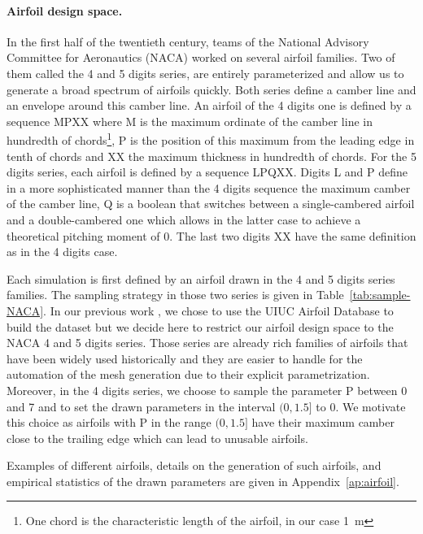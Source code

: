 \paragraph{Airfoil design space.} In the first half of the twentieth century, teams of the National Advisory Committee for Aeronautics (NACA) worked on several airfoil families. Two of them called the 4 and 5 digits series, are entirely parameterized and allow us to generate a broad spectrum of airfoils quickly. Both series define a camber line and an envelope around this camber line. An airfoil of the 4 digits one is defined by a sequence MPXX where M is the maximum ordinate of the camber line in hundredth of chords\footnote{One chord is the characteristic length of the airfoil, in our case \SI{1}{\meter}}, P is the position of this maximum from the leading edge in tenth of chords and XX the maximum thickness in hundredth of chords. For the 5 digits series, each airfoil is defined by a sequence LPQXX. Digits L and P define in a more sophisticated manner than the 4 digits sequence the maximum camber of the camber line, Q is a boolean that switches between a single-cambered airfoil and a double-cambered one which allows in the latter case to achieve a theoretical pitching moment of 0. The last two digits XX have the same definition as in the 4 digits case. 

Each simulation is first defined by an airfoil drawn in the 4 and 5 digits series families. The sampling strategy in those two series is given in Table~\ref{tab:sample-NACA}. In our previous work \cite{bonnet2022an}, we chose to use the UIUC Airfoil Database \cite{UIUC} to build the dataset but we decide here to restrict our airfoil design space to the NACA 4 and 5 digits series. Those series are already rich families of airfoils that have been widely used historically and they are easier to handle for the automation of the mesh generation due to their explicit parametrization. Moreover, in the 4 digits series, we choose to sample the parameter P between 0 and 7 and to set the drawn parameters in the interval $(0, 1.5]$ to 0. We motivate this choice as airfoils with P in the range $(0, 1.5]$ have their maximum camber close to the trailing edge which can lead to unusable airfoils.

Examples of different airfoils, details on the generation of such airfoils, and empirical statistics of the drawn parameters are given in Appendix~\ref{ap:airfoil}.

